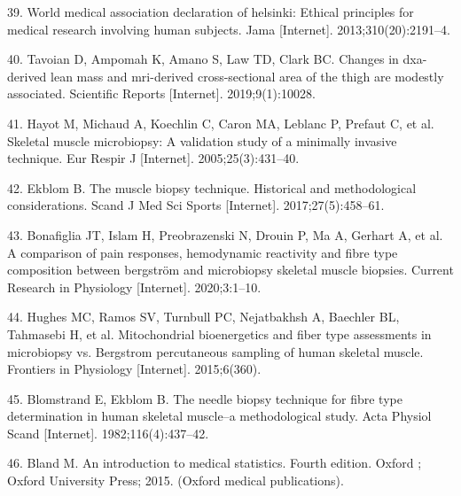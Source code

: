 \documentclass[twoside,10pt]{gihclass} %
\begin{document}
\leavevmode\hypertarget{ref-RN2548}{}%
39. World medical association declaration of helsinki: Ethical principles for medical research involving human subjects. Jama {[}Internet{]}. 2013;310(20):2191--4.

\leavevmode\hypertarget{ref-RN2541}{}%
40. Tavoian D, Ampomah K, Amano S, Law TD, Clark BC. Changes in dxa-derived lean mass and mri-derived cross-sectional area of the thigh are modestly associated. Scientific Reports {[}Internet{]}. 2019;9(1):10028.

\leavevmode\hypertarget{ref-RN824}{}%
41. Hayot M, Michaud A, Koechlin C, Caron MA, Leblanc P, Prefaut C, et al. Skeletal muscle microbiopsy: A validation study of a minimally invasive technique. Eur Respir J {[}Internet{]}. 2005;25(3):431--40.

\leavevmode\hypertarget{ref-RN2549}{}%
42. Ekblom B. The muscle biopsy technique. Historical and methodological considerations. Scand J Med Sci Sports {[}Internet{]}. 2017;27(5):458--61.

\leavevmode\hypertarget{ref-RN2553}{}%
43. Bonafiglia JT, Islam H, Preobrazenski N, Drouin P, Ma A, Gerhart A, et al. A comparison of pain responses, hemodynamic reactivity and fibre type composition between bergström and microbiopsy skeletal muscle biopsies. Current Research in Physiology {[}Internet{]}. 2020;3:1--10.

\leavevmode\hypertarget{ref-RN2552}{}%
44. Hughes MC, Ramos SV, Turnbull PC, Nejatbakhsh A, Baechler BL, Tahmasebi H, et al. Mitochondrial bioenergetics and fiber type assessments in microbiopsy vs. Bergstrom percutaneous sampling of human skeletal muscle. Frontiers in Physiology {[}Internet{]}. 2015;6(360).

\leavevmode\hypertarget{ref-RN874}{}%
45. Blomstrand E, Ekblom B. The needle biopsy technique for fibre type determination in human skeletal muscle--a methodological study. Acta Physiol Scand {[}Internet{]}. 1982;116(4):437--42.

\leavevmode\hypertarget{ref-RN2007}{}%
46. Bland M. An introduction to medical statistics. Fourth edition. Oxford ; Oxford University Press; 2015. (Oxford medical publications).


\end{document}
